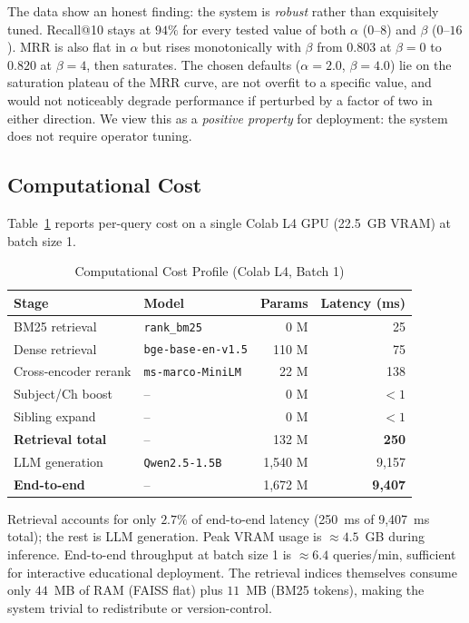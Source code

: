 \documentclass[conference]{IEEEtran}
\begin{document}
The data show an honest finding: the system is \emph{robust} rather than exquisitely tuned. Recall@10 stays at $94\%$ for every tested value of both $\alpha$ ($0$--$8$) and $\beta$ ($0$--$16$). MRR is also flat in $\alpha$ but rises monotonically with $\beta$ from $0.803$ at $\beta=0$ to $0.820$ at $\beta=4$, then saturates. The chosen defaults ($\alpha=2.0$, $\beta=4.0$) lie on the saturation plateau of the MRR curve, are not overfit to a specific value, and would not noticeably degrade performance if perturbed by a factor of two in either direction. We view this as a \emph{positive property} for deployment: the system does not require operator tuning.

\subsection{Computational Cost}
Table~\ref{tab:cost} reports per-query cost on a single Colab L4 GPU (22.5~GB VRAM) at batch size 1.

\begin{table}[!t]
\caption{Computational Cost Profile (Colab L4, Batch 1)}
\label{tab:cost}
\centering\scriptsize
\setlength{\tabcolsep}{3pt}
\begin{tabular}{@{}l l r r@{}}
\toprule
\textbf{Stage} & \textbf{Model} & \textbf{Params} & \textbf{Latency (ms)} \\
\midrule
BM25 retrieval       & \texttt{rank\_bm25}       & 0 M       & 25 \\
Dense retrieval      & \texttt{bge-base-en-v1.5} & 110 M     & 75 \\
Cross-encoder rerank & \texttt{ms-marco-MiniLM}  & 22 M      & 138 \\
Subject/Ch boost     & --                        & 0 M       & $<\!1$ \\
Sibling expand       & --                        & 0 M       & $<\!1$ \\
\midrule
\textbf{Retrieval total} & --                    & 132 M     & \textbf{250} \\
LLM generation       & \texttt{Qwen2.5-1.5B}     & 1{,}540 M & 9{,}157 \\
\midrule
\textbf{End-to-end}  & --                        & 1{,}672 M & \textbf{9{,}407} \\
\bottomrule
\end{tabular}
\end{table}

Retrieval accounts for only $2.7\%$ of end-to-end latency (250~ms of 9{,}407~ms total); the rest is LLM generation. Peak VRAM usage is ${\approx}4.5$~GB during inference. End-to-end throughput at batch size 1 is ${\approx}6.4$ queries/min, sufficient for interactive educational deployment. The retrieval indices themselves consume only $44$~MB of RAM (FAISS flat) plus $11$~MB (BM25 tokens), making the system trivial to redistribute or version-control.
\end{document}
